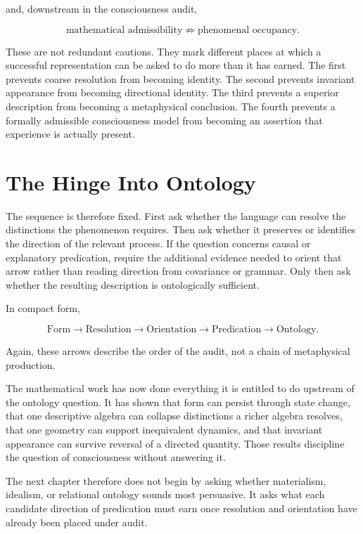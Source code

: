 and, downstream in the consciousness audit,

\[
\boxed{
\text{mathematical admissibility}
\not\Rightarrow
\text{phenomenal occupancy}.
}
\]

These are not redundant cautions. They mark different places at which a successful representation can be asked to do more than it has earned. The first prevents coarse resolution from becoming identity. The second prevents invariant appearance from becoming directional identity. The third prevents a superior description from becoming a metaphysical conclusion. The fourth prevents a formally admissible consciousness model from becoming an assertion that experience is actually present.

\section{The Hinge Into Ontology}

The sequence is therefore fixed. First ask whether the language can resolve the distinctions the phenomenon requires. Then ask whether it preserves or identifies the direction of the relevant process. If the question concerns causal or explanatory predication, require the additional evidence needed to orient that arrow rather than reading direction from covariance or grammar. Only then ask whether the resulting description is ontologically sufficient.

In compact form,

\[
\boxed{
\text{Form}
\rightarrow
\text{Resolution}
\rightarrow
\text{Orientation}
\rightarrow
\text{Predication}
\rightarrow
\text{Ontology}.
}
\]

Again, these arrows describe the order of the audit, not a chain of metaphysical production.

The mathematical work has now done everything it is entitled to do upstream of the ontology question. It has shown that form can persist through state change, that one descriptive algebra can collapse distinctions a richer algebra resolves, that one geometry can support inequivalent dynamics, and that invariant appearance can survive reversal of a directed quantity. Those results discipline the question of consciousness without answering it.

The next chapter therefore does not begin by asking whether materialism, idealism, or relational ontology sounds most persuasive. It asks what each candidate direction of predication must earn once resolution and orientation have already been placed under audit.